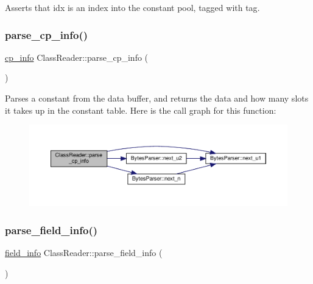 Asserts that {\ttfamily idx} is an index into the constant pool, tagged with {\ttfamily tag}. \mbox{\label{classClassReader_ac4c0b613d45cf507b2e85c61c28541cb}} 
\subsubsection{\texorpdfstring{parse\+\_\+cp\+\_\+info()}{parse\_cp\_info()}}
{\footnotesize\ttfamily \hyperlink{structcp__info}{cp\+\_\+info} Class\+Reader\+::parse\+\_\+cp\+\_\+info (\begin{DoxyParamCaption}{ }\end{DoxyParamCaption})\hspace{0.3cm}{\ttfamily [private]}}

Parses a constant from the data buffer, and returns the data and how many slots it takes up in the constant table. Here is the call graph for this function\+:
\nopagebreak
\begin{figure}[H]
\begin{center}
\leavevmode
\includegraphics[width=350pt]{classClassReader_ac4c0b613d45cf507b2e85c61c28541cb_cgraph}
\end{center}
\end{figure}
\mbox{\label{classClassReader_a434b73f04e1502c936593ab63094d838}} 
\subsubsection{\texorpdfstring{parse\+\_\+field\+\_\+info()}{parse\_field\_info()}}
{\footnotesize\ttfamily \hyperlink{structfield__info}{field\+\_\+info} Class\+Reader\+::parse\+\_\+field\+\_\+info (\begin{DoxyParamCaption}{ }\end{DoxyParamCaption})\hspace{0.3cm}{\ttfamily [private]}}



